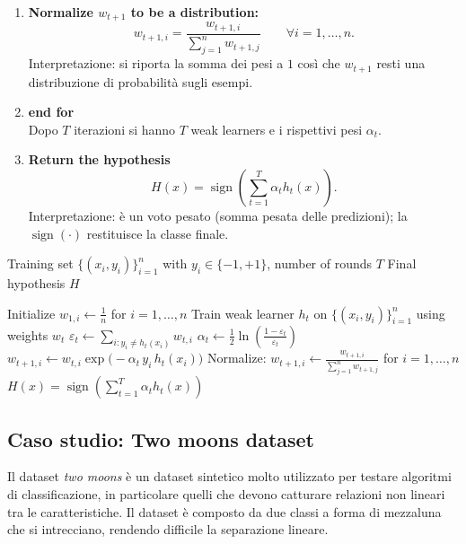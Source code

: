\begin{enumerate}
\item \textbf{Normalize $w_{t+1}$ to be a distribution:}\\
\[
w_{t+1,i}=\frac{w_{t+1,i}}{\sum_{j=1}^{n} w_{t+1,j}}\qquad \forall i=1,\ldots,n.
\]
Interpretazione: si riporta la somma dei pesi a $1$ così che $w_{t+1}$ resti una distribuzione di probabilità sugli esempi.

\item \textbf{end for}\\
Dopo $T$ iterazioni si hanno $T$ weak learners e i rispettivi pesi $\alpha_t$.
\item \textbf{Return the hypothesis}\\
\[
H(x)=\operatorname{sign}\left(\sum_{t=1}^{T}\alpha_t h_t(x)\right).
\]
Interpretazione: è un voto pesato (somma pesata delle predizioni); la $\operatorname{sign}(\cdot)$ restituisce la classe finale.
\end{enumerate}

\begin{algorithm}[htbp]
\caption{AdaBoost}
\begin{algorithmic}[1]
\Require Training set $\{(x_i,y_i)\}_{i=1}^n$ with $y_i\in\{-1,+1\}$, number of rounds $T$
\Ensure Final hypothesis $H$

\State Initialize $w_{1,i} \gets \frac{1}{n}$ for $i=1,\ldots,n$
    \State Train weak learner $h_t$ on $\{(x_i,y_i)\}_{i=1}^n$ using weights $w_t$
    \State $\varepsilon_t \gets \sum_{i: y_i \neq h_t(x_i)} w_{t,i}$
    \State $\alpha_t \gets \frac{1}{2}\ln\left(\frac{1-\varepsilon_t}{\varepsilon_t}\right)$
        \State $w_{t+1,i} \gets w_{t,i}\exp\!\big(-\alpha_t\,y_i\,h_t(x_i)\big)$
    \EndFor
    \State Normalize: $w_{t+1,i} \gets \frac{w_{t+1,i}}{\sum_{j=1}^n w_{t+1,j}}$ for $i=1,\ldots,n$
\EndFor
\State \Return $H(x) = \operatorname{sign}\left(\sum_{t=1}^T \alpha_t h_t(x)\right)$
\end{algorithmic}
\end{algorithm}

\subsection{Caso studio: Two moons dataset}
Il dataset \emph{two moons} è un dataset sintetico molto utilizzato per testare algoritmi di classificazione, in particolare quelli che devono catturare relazioni non lineari tra le caratteristiche. Il dataset è composto da due classi a forma di mezzaluna che si intrecciano, rendendo difficile la separazione lineare.


